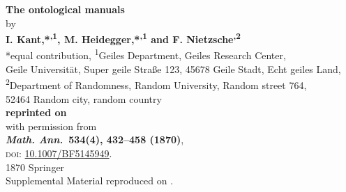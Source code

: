 		\begin{center}		
			\vspace*{15mm}
			\onehalfspacing\Large
			\textbf{The ontological manuals}\\
			\doublespacing\normalsize
			\bigskip
			by\\													
			\bigskip		
			\textbf{I. Kant,*\textsuperscript{,1}, M. Heidegger,*\textsuperscript{,1} and F. Nietzsche\textsuperscript{,2}}\\		
			{*equal contribution, \textsuperscript{1}Geiles Department, Geiles Research Center,\\Geile Universit{\"a}t, Super geile Straße 123, 45678 Geile Stadt, Echt geiles Land,\\\textsuperscript{2}Department of Randomness, Random University, Random street 764,\\52464 Random city, random country}\\	
			\bigskip
			\textbf{reprinted on }\\		
			\bigskip			
			with permission from\\
			\textbf{\textit{Math. Ann.}~\textbf{534}(4), 432--458 (1870)},\\
			\textsc{doi:} \href{https://doi.org/10.1007/BF5145949}{10.1007/BF5145949}.\\
			\myCopyrightNormal{} 1870 Springer\\
			\vspace*{\fill}
			Supplemental Material reproduced on .
		\end{center}
		


